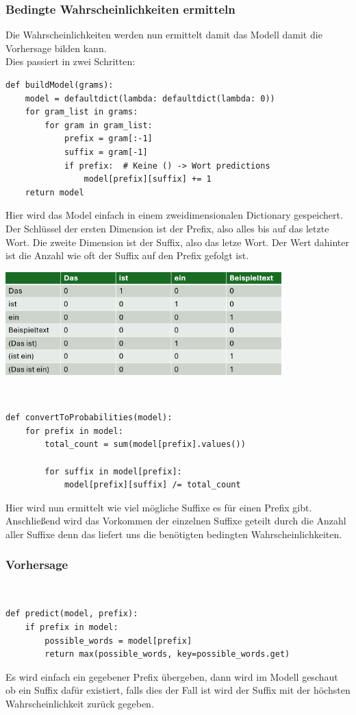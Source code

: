 \documentclass[12pt]{article}
\begin{document}
\subsubsection{Bedingte Wahrscheinlichkeiten ermitteln}
\quad Die Wahrscheinlichkeiten werden nun ermittelt damit das Modell damit die Vorhersage bilden kann.
\\Dies passiert in zwei Schritten:
\begin{lstlisting}
def buildModel(grams):
    model = defaultdict(lambda: defaultdict(lambda: 0))
    for gram_list in grams:
        for gram in gram_list:
            prefix = gram[:-1]
            suffix = gram[-1]
            if prefix:  # Keine () -> Wort predictions
                model[prefix][suffix] += 1
    return model
\end{lstlisting}
Hier wird das Model einfach in einem zweidimensionalen Dictionary gespeichert. Der Schlüssel der ersten Dimension ist der Prefix, also alles bis auf das letzte Wort. Die zweite Dimension ist der Suffix, also das letze Wort. Der Wert dahinter ist die Anzahl wie oft der Suffix auf den Prefix gefolgt ist.
\begin{center}
	\includegraphics[width=0.8\textwidth]{statics/Furitsch/table.PNG}
\end{center}
\\\begin{lstlisting}
def convertToProbabilities(model):
    for prefix in model:
        total_count = sum(model[prefix].values())

        for suffix in model[prefix]:
            model[prefix][suffix] /= total_count
\end{lstlisting}
Hier wird nun ermittelt wie viel mögliche Suffixe es für einen Prefix gibt. Anschließend wird das Vorkommen der einzelnen Suffixe geteilt durch die Anzahl aller Suffixe denn das liefert uns die benötigten bedingten Wahrscheinlichkeiten.
\subsubsection{Vorhersage}
\\\begin{lstlisting}
def predict(model, prefix):
    if prefix in model:
        possible_words = model[prefix]
        return max(possible_words, key=possible_words.get)
\end{lstlisting}
Es wird einfach ein gegebener Prefix übergeben, dann wird im Modell geschaut ob ein Suffix dafür existiert, falls dies der Fall ist wird der Suffix mit der höchsten Wahrscheinlichkeit zurück gegeben.
\end{document}
